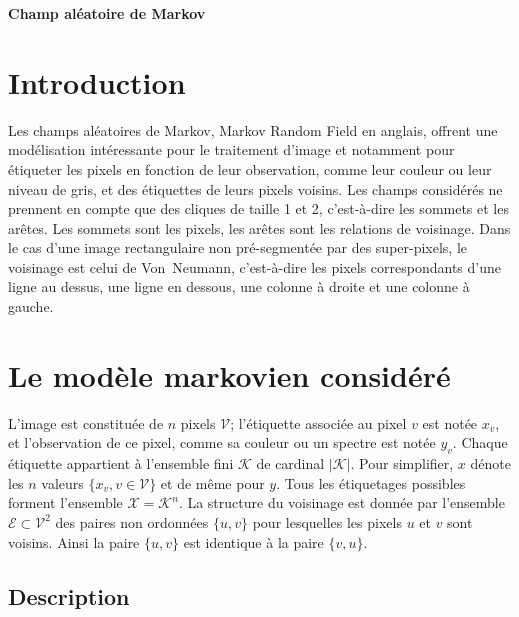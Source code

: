 \documentclass[a4paper,11pt,oneside]{article}
\begin{document}
\centerline{\sffamily\bfseries\LARGE Champ aléatoire de Markov}
\bigskip



\section{Introduction}
\label{sec:introduction}

Les champs aléatoires de Markov, \textenglish{Markov Random
  Field} en anglais, offrent une modélisation intéressante
pour le traitement d'image et notamment pour étiqueter les
pixels en fonction de leur observation, comme leur couleur
ou leur niveau de gris, et des étiquettes de leurs pixels
voisins. Les champs considérés ne prennent en compte que des
cliques de taille 1 et 2, c'est-à-dire les sommets et les
arêtes. Les sommets sont les pixels, les arêtes sont les
relations de voisinage. Dans le cas d'une image
rectangulaire non pré-segmentée par des super-pixels, le
voisinage est celui de Von~Neumann, c'est-à-dire les pixels
correspondants d'une ligne au dessus, une ligne en dessous,
une colonne à droite et une colonne à gauche.



\section{Le modèle markovien considéré}
\label{sec:modele}

L'image est constituée de $n$ pixels $\mathcal V$;
l'étiquette associée au pixel $v$ est notée $x_v$, et
l'observation de ce pixel, comme sa couleur ou un spectre
est notée $y_v$. Chaque étiquette appartient à l'ensemble
fini $\mathcal K$ de cardinal $|\mathcal K|$. Pour
simplifier, $x$ dénote les $n$ valeurs $\{x_v, v\in\mathcal
V\}$ et de même pour $y$. Tous les étiquetages possibles
forment l'ensemble $\mathcal X=\mathcal K^n$. La structure
du voisinage est donnée par l'ensemble $\mathcal
E\subset\mathcal V^2$ des paires non ordonnées $\{u, v\}$
pour lesquelles les pixels $u$ et $v$ sont voisins. Ainsi la
paire $\{u, v\}$ est identique à la paire $\{v, u\}$.



\subsection{Description}
\label{sec:description}
\end{document}
